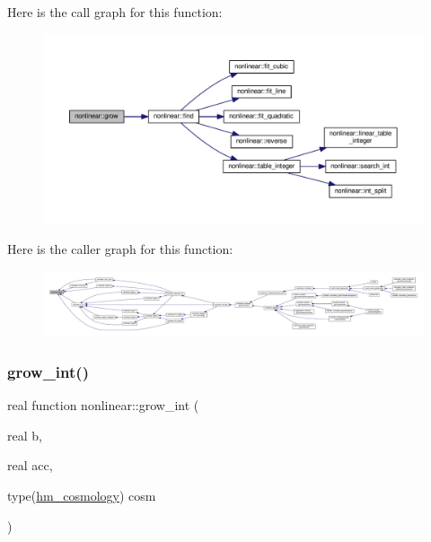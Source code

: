 Here is the call graph for this function\+:
\nopagebreak
\begin{figure}[H]
\begin{center}
\leavevmode
\includegraphics[width=350pt]{namespacenonlinear_a1870caf0d38a1c6617ca3ef8de2f6947_cgraph}
\end{center}
\end{figure}
Here is the caller graph for this function\+:
\nopagebreak
\begin{figure}[H]
\begin{center}
\leavevmode
\includegraphics[width=350pt]{namespacenonlinear_a1870caf0d38a1c6617ca3ef8de2f6947_icgraph}
\end{center}
\end{figure}
\mbox{\label{namespacenonlinear_a2ccd15402588e67b26abc93ccf910de6}} 
\subsubsection{\texorpdfstring{grow\+\_\+int()}{grow\_int()}}
{\footnotesize\ttfamily real function nonlinear\+::grow\+\_\+int (\begin{DoxyParamCaption}\item[{real}]{b,  }\item[{real}]{acc,  }\item[{type(\mbox{\hyperlink{structnonlinear_1_1hm__cosmology}{hm\+\_\+cosmology}})}]{cosm }\end{DoxyParamCaption})\hspace{0.3cm}{\ttfamily [private]}}



